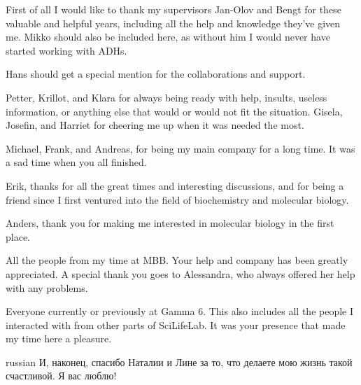 \documentclass[a4paper, twoside, 12pt, openright]{report}
\begin{document}
First of all I would like to thank my supervisors Jan-Olov and Bengt for these valuable and helpful years, including all the help and knowledge they've given me. Mikko should also be included here, as without him I would never have started working with ADHs.

Hans should get a special mention for the collaborations and support.

Petter, Krillot, and Klara for always being ready with help, insults, useless information, or anything else that would or would not fit the situation. Gisela, Josefin, and Harriet for cheering me up when it was needed the most.

Michael, Frank, and Andreas, for being my main company for a long time. It was a sad time when you all finished.

Erik, thanks for all the great times and interesting discussions, and for being a friend since I first ventured into the field of biochemistry and molecular biology.

Anders, thank you for making me interested in molecular biology in the first place.

All the people from my time at MBB. Your help and company has been greatly appreciated. A special thank you goes to Alessandra, who always offered her help with any problems.

Everyone currently or previously at Gamma 6. This also includes all the people I interacted with from other parts of SciLifeLab. It was your presence that made my time here a pleasure.

\begin{otherlanguage*}{russian}
И, наконец, спасибо Наталии и Лине за то, что делаете мою жизнь такой счастливой. Я вас люблю!
\end{otherlanguage*}



\end{document}

